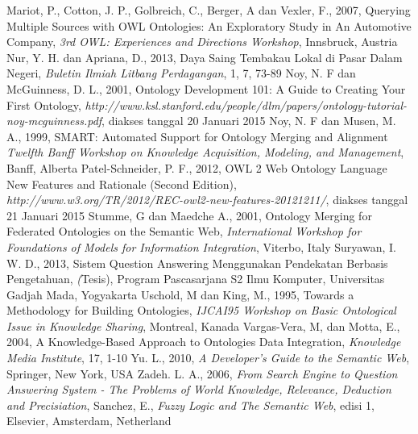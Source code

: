 \begin{thebibliography}{99}
		Mariot, P., Cotton, J. P., Golbreich, C., Berger, A dan Vexler, F., 2007, Querying Multiple Sources with OWL Ontologies: An Exploratory Study in An Automotive Company, \emph{3rd OWL: Experiences and Directions Workshop}, Innsbruck, Austria
		Nur, Y. H. dan Apriana, D., 2013, Daya Saing Tembakau Lokal di Pasar Dalam Negeri, \emph{Buletin Ilmiah Litbang Perdagangan}, 1, 7, 73-89
		Noy, N. F dan McGuinness, D. L., 2001, Ontology Development 101: A Guide to Creating Your First Ontology, \emph{http://www.ksl.stanford.edu/people/dlm/papers/ontology-tutorial-noy-mcguinness.pdf}, diakses tanggal 20 Januari 2015
		Noy, N. F dan Musen, M. A., 1999, SMART: Automated Support for Ontology Merging and Alignment \emph{Twelfth Banff Workshop on Knowledge Acquisition, Modeling, and Management}, Banff, Alberta
		Patel-Schneider, P. F., 2012, OWL 2 Web Ontology Language New Features and Rationale (Second Edition), \emph{http://www.w3.org/TR/2012/REC-owl2-new-features-20121211/}, diakses tanggal 21 Januari 2015
		Stumme, G dan Maedche A., 2001, Ontology Merging for Federated Ontologies on the Semantic Web, \emph{ International Workshop for Foundations of Models for Information Integration}, Viterbo, Italy
		Suryawan, I. W. D., 2013, Sistem Question Answering Menggunakan Pendekatan Berbasis Pengetahuan, \emph(Tesis), Program Pascasarjana S2 Ilmu Komputer, Universitas Gadjah Mada, Yogyakarta
		Uschold, M dan King, M., 1995, Towards a Methodology for Building Ontologies, \emph{IJCAI95 Workshop on Basic Ontological Issue in Knowledge Sharing}, Montreal, Kanada
		Vargas-Vera, M, dan Motta, E., 2004, A Knowledge-Based Approach to Ontologies Data Integration, \emph{Knowledge Media Institute}, 17, 1-10
		Yu. L., 2010, \emph{A Developer's Guide to the Semantic Web}, Springer, New York, USA
		Zadeh. L. A., 2006, \emph{From Search Engine to Question Answering System - The Problems of World Knowledge, Relevance, Deduction and Precisiation}, Sanchez, E., \emph{Fuzzy Logic and The Semantic Web}, edisi 1, Elsevier, Amsterdam, Netherland
\end{thebibliography}